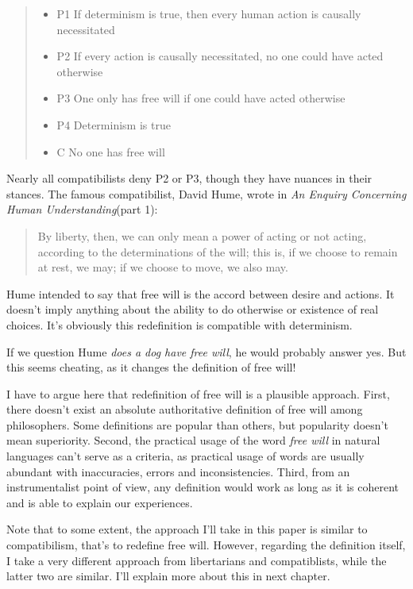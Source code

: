 \begin{quote}
  \begin{itemize}
    \item P1 If determinism is true, then every human action is causally necessitated
    \item P2 If every action is causally necessitated, no one could have acted otherwise
    \item P3 One only has free will if one could have acted otherwise
    \item P4 Determinism is true
    \item C No one has free will
  \end{itemize}
\end{quote}

Nearly all compatibilists deny P2 or P3, though they have nuances in their stances. The famous compatibilist, David Hume, wrote in \emph{An Enquiry Concerning Human Understanding}(part 1):

\begin{quote}
By liberty, then, we can only mean a power of acting or not acting, according to the determinations of the will; this is, if we choose to remain at rest, we may; if we choose to move, we also may.
\end{quote}

Hume intended to say that free will is the accord between desire and actions. It doesn't imply anything about the ability to do otherwise or existence of real choices. It's obviously this redefinition is compatible with determinism.

If we question Hume \emph{does a dog have free will}, he would probably answer yes. But this seems cheating, as it changes the definition of free will!

I have to argue here that redefinition of free will is a plausible approach. First, there doesn't exist an absolute authoritative definition of free will among philosophers. Some definitions are popular than others, but popularity doesn't mean superiority. Second, the practical usage of the word \emph{free will} in natural languages can't serve as a criteria, as practical usage of words are usually abundant with inaccuracies,  errors and inconsistencies. Third, from an instrumentalist point of view, any definition would work as long as it is coherent and is able to explain our experiences.

Note that to some extent, the approach I'll take in this paper is similar to compatibilism, that's to redefine free will. However, regarding the definition itself, I take a very different approach from libertarians and compatiblists, while the latter two are similar. I'll explain more about this in next chapter.

